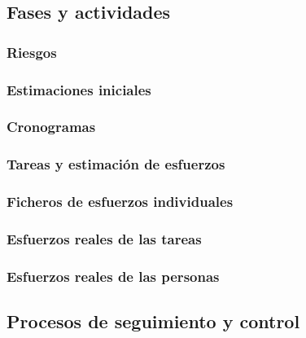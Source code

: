 \documentclass[10pt,spanish]{article}
\begin{document}
\subsection{Fases y actividades}


\subsubsection{Riesgos}\label{subsec:riesgos}


\subsubsection{Estimaciones iniciales}


\subsubsection{Cronogramas}


\subsubsection{Tareas y estimación de esfuerzos}


\subsubsection{Ficheros de esfuerzos individuales}


\subsubsection{Esfuerzos reales de las tareas}\label{sec:esfuerzos_reales}


\subsubsection{Esfuerzos reales de las personas}


\subsection{Procesos de seguimiento y control}

\end{document}
